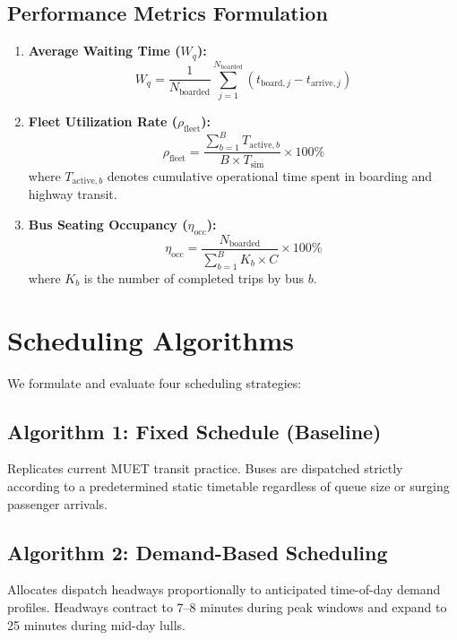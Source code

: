 \documentclass[conference]{IEEEtran}
\begin{document}
\subsection{Performance Metrics Formulation}
\begin{enumerate}
    \item \textbf{Average Waiting Time ($W_q$):}
    \begin{equation}
    W_q = \frac{1}{N_{\text{boarded}}} \sum_{j=1}^{N_{\text{boarded}}} (t_{\text{board}, j} - t_{\text{arrive}, j})
    \end{equation}
    \item \textbf{Fleet Utilization Rate ($\rho_{\text{fleet}}$):}
    \begin{equation}
    \rho_{\text{fleet}} = \frac{\sum_{b=1}^{B} T_{\text{active}, b}}{B \times T_{\text{sim}}} \times 100\%
    \end{equation}
    where $T_{\text{active}, b}$ denotes cumulative operational time spent in boarding and highway transit.
    \item \textbf{Bus Seating Occupancy ($\eta_{\text{occ}}$):}
    \begin{equation}
    \eta_{\text{occ}} = \frac{N_{\text{boarded}}}{\sum_{b=1}^{B} K_b \times C} \times 100\%
    \end{equation}
    where $K_b$ is the number of completed trips by bus $b$.
\end{enumerate}

\section{Scheduling Algorithms}
We formulate and evaluate four scheduling strategies:
\subsection{Algorithm 1: Fixed Schedule (Baseline)}
Replicates current MUET transit practice. Buses are dispatched strictly according to a predetermined static timetable regardless of queue size or surging passenger arrivals.

\subsection{Algorithm 2: Demand-Based Scheduling}
Allocates dispatch headways proportionally to anticipated time-of-day demand profiles. Headways contract to 7--8 minutes during peak windows and expand to 25 minutes during mid-day lulls.
\end{document}
